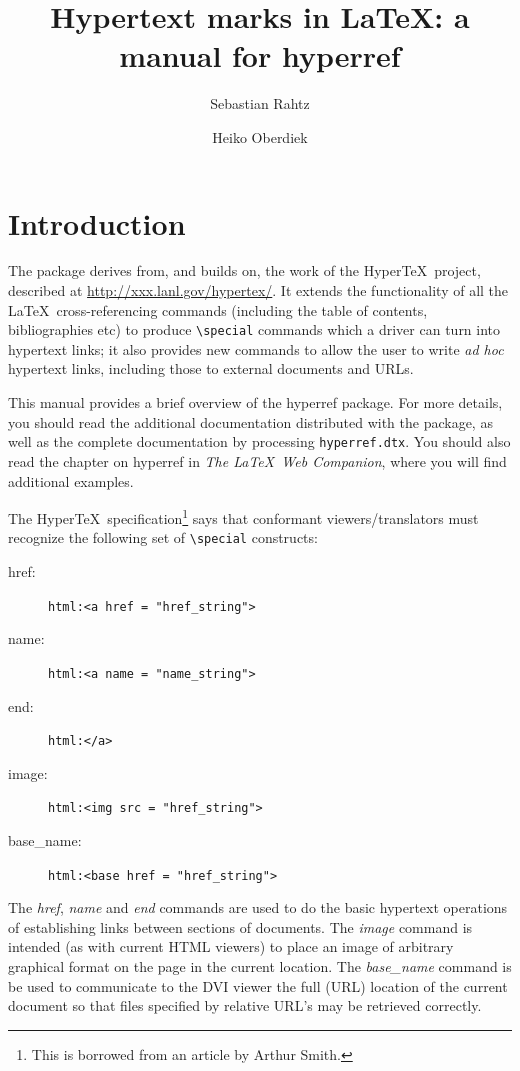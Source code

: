\documentclass[pdftex]{article}
\title{Hypertext marks in \LaTeX: a manual for \textsf{hyperref}}
\author{Sebastian Rahtz \and  Heiko Oberdiek}
\date{\mydate}
\begin{document}
\thispagestyle{empty}
\maketitle
\tableofcontents
\setcounter{tocdepth}{2}%

\section{Introduction}

The package derives from, and builds on, the work of the Hyper\TeX\
project, described at \url{http://xxx.lanl.gov/hypertex/}. It extends
the functionality of all the \LaTeX\ cross-referencing commands
(including the table of contents, bibliographies etc) to produce
\verb|\special| commands which a driver can turn into hypertext links;
it also provides new commands to allow the user to write \emph{ad hoc}
hypertext links, including those to external documents and URLs.

This manual provides a brief overview of the \textsf{hyperref}
package. For more details, you should read the additional documentation
distributed with the package, as well as the complete documentation by
processing \texttt{hyperref.dtx}. You should also read the chapter on
\textsf{hyperref} in \textit{The \LaTeX\ Web Companion}, where you will
find additional examples.

The Hyper\TeX\ specification\footnote{This is borrowed from an article
by Arthur Smith.} says that conformant viewers/translators must
recognize the following set of \verb|\special| constructs:

\begin{description}
\item[href:] \verb|html:<a href = "href_string">|
\item[name:] \verb|html:<a name = "name_string">|
\item[end:] \verb|html:</a>|
\item[image:] \verb|html:<img src = "href_string">|
\item[base\_name:] \verb|html:<base href = "href_string">|
\end{description}

The \emph{href}, \emph{name} and \emph{end} commands are used to do the
basic hypertext operations of establishing links between sections of
documents. The \emph{image} command is intended (as with current HTML
viewers) to place an image of arbitrary graphical format on the page in
the current location. The \emph{base\_name} command is be used to
communicate to the DVI viewer the full (URL) location of the current
document so that files specified by relative URL's may be retrieved
correctly.
\end{document}
